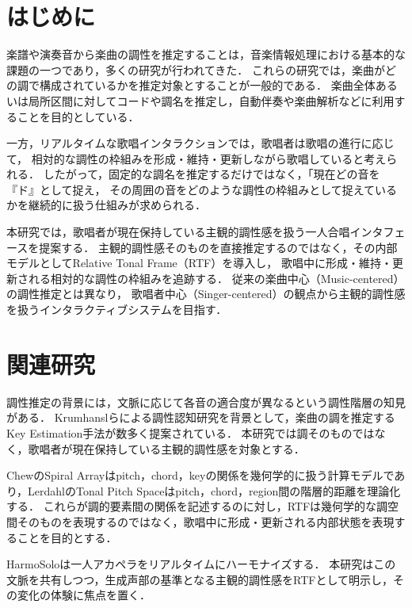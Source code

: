 \section{はじめに}
楽譜や演奏音から楽曲の調性を推定することは，音楽情報処理における基本的な課題の一つであり，多くの研究が行われてきた．
これらの研究では，楽曲がどの調で構成されているかを推定対象とすることが一般的である．
楽曲全体あるいは局所区間に対してコードや調名を推定し，自動伴奏や楽曲解析などに利用することを目的としている．

一方，リアルタイムな歌唱インタラクションでは，歌唱者は歌唱の進行に応じて，
相対的な調性の枠組みを形成・維持・更新しながら歌唱していると考えられる．
したがって，固定的な調名を推定するだけではなく，「現在どの音を『ド』として捉え，
その周囲の音をどのような調性の枠組みとして捉えているかを継続的に扱う仕組みが求められる．

本研究では，歌唱者が現在保持している主観的調性感を扱う一人合唱インタフェースを提案する．
主観的調性感そのものを直接推定するのではなく，その内部モデルとしてRelative Tonal Frame（RTF）を導入し，
歌唱中に形成・維持・更新される相対的な調性の枠組みを追跡する．
従来の楽曲中心（Music-centered）の調性推定とは異なり，
歌唱者中心（Singer-centered）の観点から主観的調性感を扱うインタラクティブシステムを目指す．

\section{関連研究}
調性推定の背景には，文脈に応じて各音の適合度が異なるという調性階層の知見がある．
Krumhanslらによる調性認知研究を背景として，楽曲の調を推定するKey Estimation手法が数多く提案されている\cite{Krumhansl1982,Temperley1999}．
本研究では調そのものではなく，歌唱者が現在保持している主観的調性感を対象とする．

ChewのSpiral Arrayはpitch，chord，keyの関係を幾何学的に扱う計算モデルであり\cite{Chew2014}，LerdahlのTonal Pitch Spaceはpitch，chord，region間の階層的距離を理論化する\cite{TPS}．
これらが調的要素間の関係を記述するのに対し，RTFは幾何学的な調空間そのものを表現するのではなく，歌唱中に形成・更新される内部状態を表現することを目的とする．


HarmoSoloは一人アカペラをリアルタイムにハーモナイズする\cite{tokunaga2026}．
本研究はこの文脈を共有しつつ，生成声部の基準となる主観的調性感をRTFとして明示し，その変化の体験に焦点を置く．


